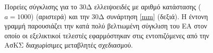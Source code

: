 \begin{figure}[h!]
\begin{minipage}[b]{0.5\linewidth}
 \centering
\end{minipage}
\begin{minipage}[b]{0.5\linewidth}
 \centering
\end{minipage}
\caption{Πορείες σύγκλισης για το 30Δ ελλειψοειδές με αριθμό κατάστασης ($a\!=\!1000$) (αριστερά)  και την 30Δ συνάρτηση \ref{mm} (δεξιά). Η έντονη γραμμή παρουσιάζει την κατά πολύ βελτιωμένη σύγκλιση του ΕΑ στον οποίο οι εξελικτικοί τελεστές εφαρμόστηκαν στις εντοπιζόμενες από την ΑσΚΣ διαχωρίσιμες μεταβλητές σχεδιασμού.} 
\label{ellipse_t2_pca}
\end{figure} 

